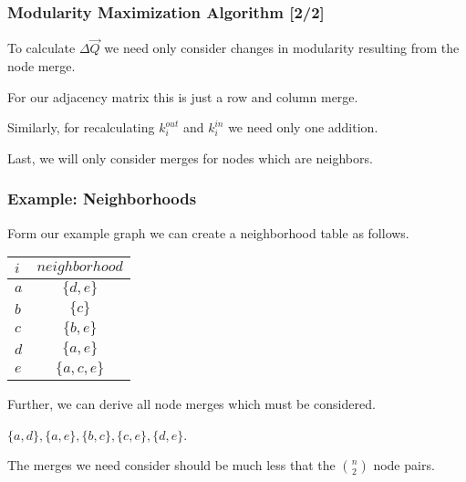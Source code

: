 \documentclass{beamer}
\newcommand{\ds}{\displaystyle}
\begin{document}
\begin{frame}

    \frametitle{Modularity Maximization Algorithm [2/2]}

    To calculate $ \Delta \vec{Q} $ we need only consider changes in modularity resulting from the node merge.\pause

    \vspace{2.5mm}
    For our adjacency matrix this is just a row and column merge.\pause

    \vspace{2.5mm}
    Similarly, for recalculating $ k_{i}^{out} $ and $ k_{i}^{in} $ we need only one addition.\pause

    \vspace{2.5mm} 
    Last, we will only consider merges for nodes which are neighbors. 

\end{frame}

\begin{frame}

    \frametitle{Example: Neighborhoods}

    Form our example graph we can create a neighborhood table as follows.\pause

    \vspace{2.5mm}
    \begin{center}
        \begin{tabular}{l | c} 
            $ i           $ & $ neighborhood $ \\
            \hline
            $ a $ & $ \{d, e\}    $ \\
            $ b $ & $ \{c\}       $ \\
            $ c $ & $ \{b, e\}    $ \\
            $ d $ & $ \{a, e\}    $ \\
            $ e $ & $ \{a, c, e\} $ \\
        \end{tabular}
    \end{center}\pause

    \vspace{2.5mm}
    Further, we can derive all node merges which must be considered.\pause

    \vspace{2.5mm}
    \begin{center}
        $ \{a, d\}, \{a, e\}, \{b, c\}, \{c, e\}, \{d, e\} $.
    \end{center}\pause

    \vspace{2.5mm}
    The merges we need consider should be much less that the $ \ds \binom{n}{2} $ node pairs.  

\end{frame}
\end{document}

